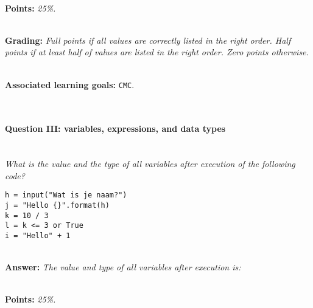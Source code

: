\ \\

\textbf{Points:} \textit{25\%.}

\ \\ 

\textbf{Grading:} \textit{Full points if all values are correctly listed in the right order. Half points if at least half of values are listed in the right order. Zero points otherwise.}

\ \\ 

\textbf{Associated learning goals:} \texttt{CMC}.

\ \\ 

\paragraph{Question III: variables, expressions, and data types}

\ \\ 

\textit{What is the value and the type of all variables after execution of the following code?}
\begin{lstlisting}
h = input("Wat is je naam?")
j = "Hello {}".format(h)
k = 10 / 3
l = k <= 3 or True
i = "Hello" + 1
\end{lstlisting}

\ \\ 

\textbf{Answer:} \textit{The value and type of all variables after execution is:}


\ \\ 

\textbf{Points:} \textit{25\%.}

\ \\ 

